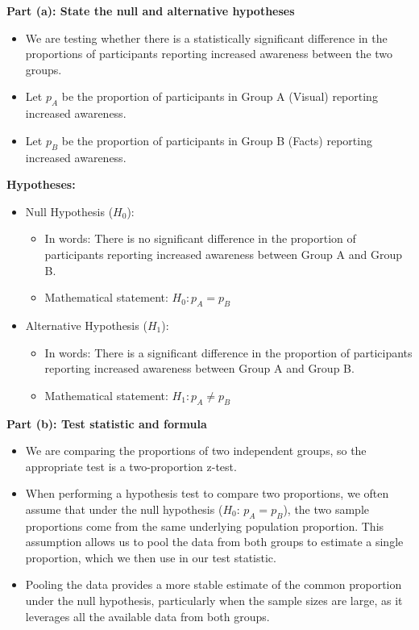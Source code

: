 \documentclass{article}
\begin{document}
\textbf{Part (a): State the null and alternative hypotheses}

\begin{itemize}
    \item We are testing whether there is a statistically significant difference in the proportions of participants reporting increased awareness between the two groups.
    \item Let \( p_A \) be the proportion of participants in Group A (Visual) reporting increased awareness.
    \item Let \( p_B \) be the proportion of participants in Group B (Facts) reporting increased awareness.
\end{itemize}

\textbf{Hypotheses:}
\begin{itemize}
    \item Null Hypothesis (\( H_0 \)):
    \begin{itemize}
        \item In words: There is no significant difference in the proportion of participants reporting increased awareness between Group A and Group B.
        \item Mathematical statement: \( H_0: p_A = p_B \)
    \end{itemize}
    
    \item Alternative Hypothesis (\( H_1 \)):
    \begin{itemize}
        \item In words: There is a significant difference in the proportion of participants reporting increased awareness between Group A and Group B.
        \item Mathematical statement: \( H_1: p_A \neq p_B \)
    \end{itemize}
\end{itemize}

\textbf{Part (b): Test statistic and formula}

\begin{itemize}
    \item We are comparing the proportions of two independent groups, so the appropriate test is a two-proportion z-test.
    \item When performing a hypothesis test to compare two proportions, we often assume that under the null hypothesis (\( H_0 \): \( p_A = p_B \)), the two sample proportions come from the same underlying population proportion. This assumption allows us to pool the data from both groups to estimate a single proportion, which we then use in our test statistic.
    \item Pooling the data provides a more stable estimate of the common proportion under the null hypothesis, particularly when the sample sizes are large, as it leverages all the available data from both groups.
\end{itemize}
\end{document}
